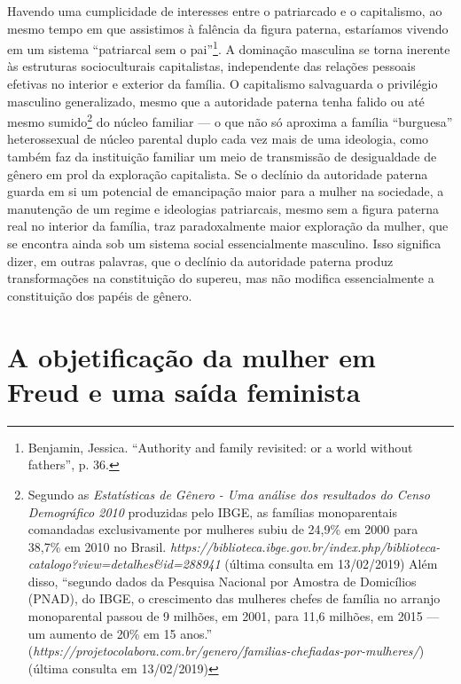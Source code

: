 Havendo uma cumplicidade de interesses entre o patriarcado e o
capitalismo, ao mesmo tempo em que assistimos à falência da figura
paterna, estaríamos vivendo em um sistema ``patriarcal sem o
pai''\footnote{Benjamin, Jessica. ``Authority and family revisited: or a
  world without fathers'', p. 36.}. A dominação masculina se torna
inerente às estruturas socioculturais capitalistas, independente das
relações pessoais efetivas no interior e exterior da família. O
capitalismo salvaguarda o privilégio masculino generalizado, mesmo que a
autoridade paterna tenha falido ou até mesmo sumido\footnote{Segundo as
  \emph{Estatísticas de Gênero - Uma análise dos resultados do Censo
  Demográfico 2010} produzidas pelo IBGE, as famílias monoparentais
  comandadas exclusivamente por mulheres subiu de 24,9\% em 2000 para
  38,7\% em 2010 no Brasil.
  \emph{https://biblioteca.ibge.gov.br/index.php/biblioteca-catalogo?view=detalhes\&id=288941}
  (última consulta em 13/02/2019) Além disso, ``segundo dados da
  Pesquisa Nacional por Amostra de Domicílios (PNAD), do IBGE, o
  crescimento das mulheres chefes de família no arranjo monoparental
  passou de 9 milhões, em 2001, para 11,6 milhões, em 2015 --- um aumento
  de 20\% em 15 anos.''
  (\emph{https://projetocolabora.com.br/genero/familias-chefiadas-por-mulheres/})
  (última consulta em 13/02/2019)} do núcleo familiar --- o que não só
aproxima a família ``burguesa'' heterossexual de núcleo parental duplo
cada vez mais de uma ideologia, como também faz da instituição familiar
um meio de transmissão de desigualdade de gênero em prol da exploração
capitalista. Se o declínio da autoridade paterna guarda em si um
potencial de emancipação maior para a mulher na sociedade, a manutenção
de um regime e ideologias patriarcais, mesmo sem a figura paterna real
no interior da família, traz paradoxalmente maior exploração da mulher,
que se encontra ainda sob um sistema social essencialmente masculino.
Isso significa dizer, em outras palavras, que o declínio da autoridade
paterna produz transformações na constituição do supereu, mas não
modifica essencialmente a constituição dos papéis de gênero.

\section{A objetificação da mulher em Freud e uma saída feminista}

